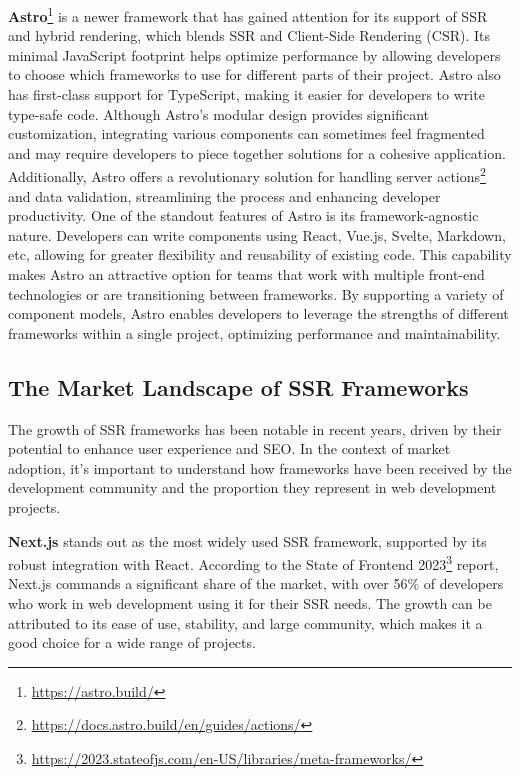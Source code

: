 \textbf{Astro}\footnote{\url{https://astro.build/}} is a newer framework that has gained attention for its support of SSR and hybrid rendering, which blends SSR and Client-Side Rendering (CSR). Its minimal JavaScript footprint helps optimize performance by allowing developers to choose which frameworks to use for different parts of their project. Astro also has first-class support for TypeScript, making it easier for developers to write type-safe code. Although Astro’s modular design provides significant customization, integrating various components can sometimes feel fragmented and may require developers to piece together solutions for a cohesive application. Additionally, Astro offers a revolutionary solution for handling server actions\footnote{\url{https://docs.astro.build/en/guides/actions/}} and data validation, streamlining the process and enhancing developer productivity.
One of the standout features of Astro is its framework-agnostic nature. Developers can write components using React, Vue.js, Svelte, Markdown, etc, allowing for greater flexibility and reusability of existing code. This capability makes Astro an attractive option for teams that work with multiple front-end technologies or are transitioning between frameworks. By supporting a variety of component models, Astro enables developers to leverage the strengths of different frameworks within a single project, optimizing performance and maintainability.


\subsection{The Market Landscape of SSR Frameworks}

The growth of SSR frameworks has been notable in recent years, driven by their potential to enhance user experience and SEO. In the context of market adoption, it's important to understand how frameworks have been received by the development community and the proportion they represent in web development projects.

\textbf{Next.js} stands out as the most widely used SSR framework, supported by its robust integration with React. According to the State of Frontend 2023\footnote{\url{https://2023.stateofjs.com/en-US/libraries/meta-frameworks/}} report, Next.js commands a significant share of the market, with over 56\% of developers who work in web development using it for their SSR needs. The growth can be attributed to its ease of use, stability, and large community, which makes it a good choice for a wide range of projects.

